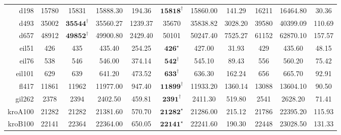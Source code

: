 \documentclass[12pt]{ctexart}
\begin{document}
\begin{table}[htbp]
\begin{tabular}{rcccccccccc}
        d198                          & 15780                             & 15831                       & 15888.30                               & 194.36           & $\textbf{15818}^\dag$   & 15860.00         & 141.29           & 16211                 & 16464.80         & 30.36            \\
        d493&35002& $\textbf{35544}^\dag$ &35560.27 &1239.37 &35670&35838.82 &3028.20 &39580&40399.09 &110.69 \\
        d657&48912& $\textbf{49852}^\dag$ &49900.80 &2429.40 &50101&50247.40 &7525.27 &61152&62870.10 &157.57 \\
        eil51                         & 426                               & 435                         & 435.40                                 & 254.25           & $\textbf{426}^\star$    & 427.00           & 31.93            & 429                   & 435.60           & 48.15            \\
        eil76                         & 538                               & 546                         & 546.00                                 & 374.14           & $\textbf{542}^\dag$     & 545.10           & 89.43            & 556                   & 560.20           & 75.42            \\
        eil101                        & 629                               & 639                         & 641.20                                 & 473.52           & $\textbf{633}^\dag$     & 636.30           & 162.24           & 656                   & 665.70           & 92.91            \\
        fl417&11861&11962&11977.00 &947.40 & $\textbf{11899}^\dag$ &11933.20 &1360.14 &13088&13604.10 &90.50 \\
        gil262                        & 2378                              & 2394                        & 2402.50                                & 459.81           & $\textbf{2391}^\dag$    & 2411.30          & 519.80           & 2541                  & 2628.20          & 71.41            \\
        kroA100                       & 21282                             & 21282                       & 21381.60                               & 570.70           & $\textbf{21282}^\star$  & 21286.00         & 215.12           & 21786                 & 22395.20         & 115.93           \\
        kroB100                       & 22141                             & 22364                       & 22364.00                               & 650.05           & $\textbf{22141}^\star$  & 22241.60         & 190.30           & 22448                 & 23028.50         & 131.33           \\

\end{tabular}
\end{table}
\end{document}
